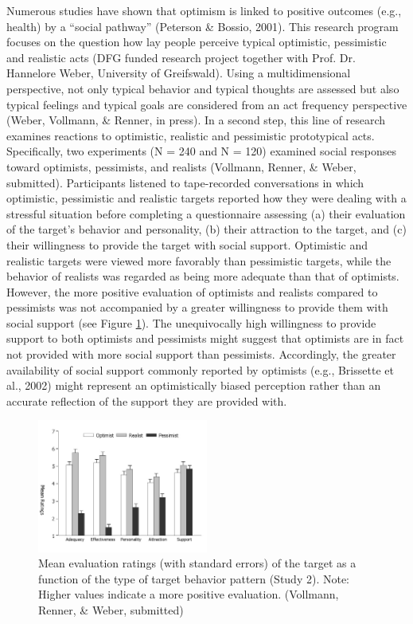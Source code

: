 { Numerous studies have shown that optimism is linked to positive outcomes (e.g., health) by a ``social pathway'' (Peterson \& Bossio, 2001). This research program focuses on the question how lay people perceive typical optimistic, pessimistic and realistic acts (DFG funded research project together with Prof. Dr. Hannelore Weber, University of Greifswald). Using a multidimensional perspective, not only typical behavior and typical thoughts are assessed but also typical feelings and typical goals are considered from an act frequency perspective (Weber, Vollmann, \& Renner, in press). In a second step, this line of research examines reactions to optimistic, realistic and pessimistic prototypical acts. Specifically, two experiments (N = 240 and N = 120) examined social responses toward optimists, pessimists, and realists (Vollmann, Renner, \& Weber, submitted). Participants listened to tape-recorded conversations in which optimistic, pessimistic and realistic targets reported how they were dealing with a stressful situation before completing a questionnaire assessing (a) their evaluation of the target's behavior and personality, (b) their attraction to the target, and (c) their willingness to provide the target with social support. Optimistic and realistic targets were viewed more favorably than pessimistic targets, while the behavior of realists was regarded as being more adequate than that of optimists. However, the more positive evaluation of optimists and realists compared to pessimists was not accompanied by a greater willingness to provide them with social support (see Figure \ref{fig3:profBrittaRenner}). The unequivocally high willingness to provide support to both optimists and pessimists might suggest that optimists are in fact not provided with more social support than pessimists. Accordingly, the greater availability of social support commonly reported by optimists (e.g., Brissette et al., 2002) might represent an optimistically biased perception rather than an accurate reflection of the support they are provided with.

\begin{figure}[ht]
  \begin{center}
    \includegraphics[height=25ex, width=0.5\textwidth]{profBrittaRenner-fig3.jpg}
    \caption{Mean evaluation ratings (with standard errors) of the target as a function of the type of target behavior pattern (Study 2). Note: Higher values indicate a more positive evaluation. (Vollmann, Renner, \& Weber, submitted)}\label{fig3:profBrittaRenner}
   \end{center}
\end{figure}


}
